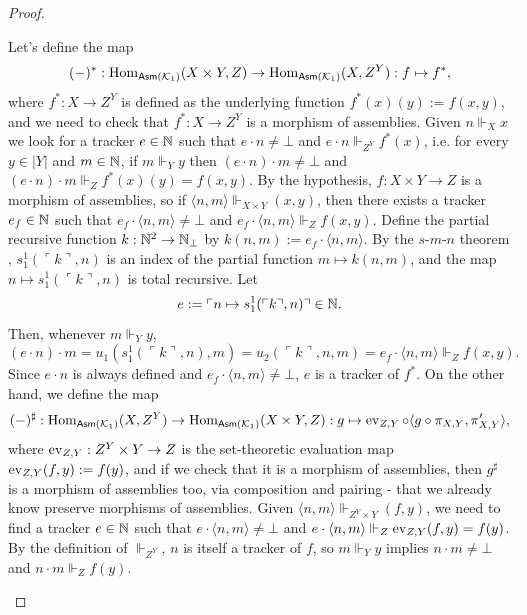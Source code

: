 \begin{proof}
\begin{itemize}
        Let's define the map
        \[ (-)^* : \operatorname{Hom}_{\mathsf{Asm}(\mathcal K_1)}(X \times Y,Z) \to \operatorname{Hom}_{\mathsf{Asm}(\mathcal K_1)}(X,Z^Y) : f \mapsto f^*, \]
        where $f^* : X \to Z^Y$ is defined as the underlying function $f^*(x)(y) := f(x,y)$, and we need to check that $f^* : X \to Z^Y$ is a morphism of assemblies.
        Given $n \Vdash_X x$ we look for a tracker $e \in \mathbb{N}$ such that $e \cdot n \ne \bot$ and $e \cdot n \Vdash_{Z^Y} f^*(x)$, i.e. for every $y \in |Y|$ and $m \in \mathbb{N}$, if $m \Vdash_Y y$ then $(e \cdot n) \cdot m \ne \bot$ and $(e \cdot n) \cdot m \Vdash_Z f^*(x)(y) = f(x,y)$.\newline
        By the hypothesis, $f : X \times Y \to Z$ is a morphism of assemblies, so if $\langle n,m \rangle \Vdash_{X \times Y} (x,y)$, then there exists a tracker $e_f \in \mathbb{N}$ such that $e_f \cdot \langle n,m \rangle \ne \bot$ and $e_f \cdot \langle n,m \rangle \Vdash_Z f(x,y)$.
        Define the partial recursive function $k : \mathbb{N}^2 \to \mathbb{N}_\bot$ by $k(n,m) := e_f \cdot \langle n,m \rangle$. By the $s$-$m$-$n$ theorem \cite{WikipediaSmnTheorem2026}, $s_1^1(\ulcorner k \urcorner,n)$ is an index of the partial function $m \mapsto k(n,m)$, and the map $n \mapsto s_1^1(\ulcorner k \urcorner,n)$ is total recursive. Let
        \[ e := \ulcorner n \mapsto s_1^1(\ulcorner k \urcorner,n) \urcorner \in \mathbb{N}. \]
        Then, whenever $m \Vdash_Y y$,
        \[ (e \cdot n) \cdot m = u_1(s_1^1(\ulcorner k \urcorner,n),m) = u_2(\ulcorner k \urcorner,n,m) = e_f \cdot \langle n,m \rangle \Vdash_Z f(x,y). \]
        Since $e \cdot n$ is always defined and $e_f \cdot \langle n,m \rangle \ne \bot$, $e$ is a tracker of $f^*$.\newline
        On the other hand, we define the map
        \[ (-)^\sharp : \operatorname{Hom}_{\mathsf{Asm}(\mathcal K_1)}(X,Z^Y) \to \operatorname{Hom}_{\mathsf{Asm}(\mathcal K_1)}(X \times Y,Z) : g \mapsto \operatorname{ev}_{Z,Y} \circ \langle g \circ \pi_{X,Y},\pi_{X,Y}' \rangle, \]
        where $\operatorname{ev}_{Z,Y} : Z^Y \times Y \to Z$ is the set-theoretic evaluation map $\operatorname{ev}_{Z,Y}(f,y) := f(y)$, and if we check that it is a morphism of assemblies, then $g^\sharp$ is a morphism of assemblies too, via composition and pairing - that we already know preserve morphisms of assemblies.\newline
        Given $\langle n,m \rangle \Vdash_{Z^Y \times Y} (f,y)$, we need to find a tracker $e \in \mathbb{N}$ such that $e \cdot \langle n,m \rangle \ne \bot$ and $e \cdot \langle n,m \rangle \Vdash_Z \operatorname{ev}_{Z,Y}(f,y) = f(y)$.
        By the definition of $\Vdash_{Z^Y}$, $n$ is itself a tracker of $f$, so $m \Vdash_Y y$ implies $n \cdot m \ne \bot$ and $n \cdot m \Vdash_Z f(y)$.

\end{itemize}
\end{proof}
